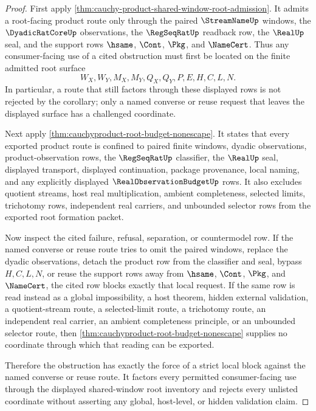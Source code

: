 \begin{proof}
First apply \autoref{thm:cauchy-product-shared-window-root-admission}. It admits a root-facing product route only through the paired $\StreamNameUp$ windows, the $\DyadicRatCoreUp$ observations, the $\RegSeqRatUp$ readback row, the $\RealUp$ seal, and the support rows $\hsame$, $\Cont$, $\Pkg$, and $\NameCert$. Thus any consumer-facing use of a cited obstruction must first be located on the finite admitted root surface
$$
W_X,W_Y,M_X,M_Y,Q_X,Q_Y,P,E,H,C,L,N.
$$
In particular, a route that still factors through these displayed rows is not rejected by the corollary; only a named converse or reuse request that leaves the displayed surface has a challenged coordinate.

Next apply \autoref{thm:cauchyproduct-root-budget-nonescape}. It states that every exported product route is confined to paired finite windows, dyadic observations, product-observation rows, the $\RegSeqRatUp$ classifier, the $\RealUp$ seal, displayed transport, displayed continuation, package provenance, local naming, and any explicitly displayed $\RealObservationBudgetUp$ rows. It also excludes quotient streams, host real multiplication, ambient completeness, selected limits, trichotomy rows, independent real carriers, and unbounded selector rows from the exported root formation packet.

Now inspect the cited failure, refusal, separation, or countermodel row. If the named converse or reuse route tries to omit the paired windows, replace the dyadic observations, detach the product row from the classifier and seal, bypass $H,C,L,N$, or reuse the support rows away from $\hsame$, $\Cont$, $\Pkg$, and $\NameCert$, the cited row blocks exactly that local request. If the same row is read instead as a global impossibility, a host theorem, hidden external validation, a quotient-stream route, a selected-limit route, a trichotomy route, an independent real carrier, an ambient completeness principle, or an unbounded selector route, then \autoref{thm:cauchyproduct-root-budget-nonescape} supplies no coordinate through which that reading can be exported.

Therefore the obstruction has exactly the force of a strict local block against the named converse or reuse route. It factors every permitted consumer-facing use through the displayed shared-window root inventory and rejects every unlisted coordinate without asserting any global, host-level, or hidden validation claim.
\end{proof}
